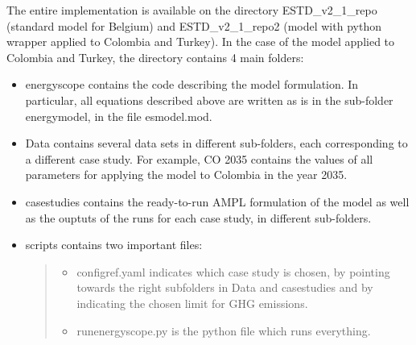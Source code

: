 \documentclass[
]{article}
\providecommand{\tightlist}{%
  \setlength{\itemsep}{0pt}\setlength{\parskip}{0pt}}
\begin{document}
The entire implementation is available on the directory
ESTD\_v2\_1\_repo (standard model for Belgium) and ESTD\_v2\_1\_repo2
(model with python wrapper applied to Colombia and Turkey). In the case
of the model applied to Colombia and Turkey, the directory contains 4
main folders:

\begin{itemize}
\item
  \textquotesingle energyscope\textquotesingle{} contains the code
  describing the model formulation. In particular, all equations
  described above are written as is in the sub-folder
  \textquotesingle energy\label{model}{model}\textquotesingle,
  in the file
  \textquotesingle es\label{model.mod}{model.mod}\textquotesingle.
\item
  \textquotesingle Data\textquotesingle{} contains several data sets in
  different sub-folders, each corresponding to a different case study.
  For example, \textquotesingle CO 2035\textquotesingle{} contains the
  values of all parameters for applying the model to Colombia in the
  year 2035.
\item
  \textquotesingle case\label{studies}{studies}\textquotesingle{}
  contains the ready-to-run AMPL formulation of the model as well as the
  ouptuts of the runs for each case study, in different sub-folders.
\item
  \textquotesingle scripts\textquotesingle{} contains two important
  files:

  \begin{quote}
  \begin{itemize}
  \tightlist
  \item
    config\label{ref.yaml}{ref.yaml} indicates which case
    study is chosen, by pointing towards the right subfolders in
    \textquotesingle Data\textquotesingle{} and
    \textquotesingle case\label{studies}{studies}\textquotesingle{}
    and by indicating the chosen limit for GHG emissions.
  \item
    run\label{energyscope.py}{energyscope.py} is the
    python file which runs everything.
  \end{itemize}
  \end{quote}
\end{itemize}
\end{document}
